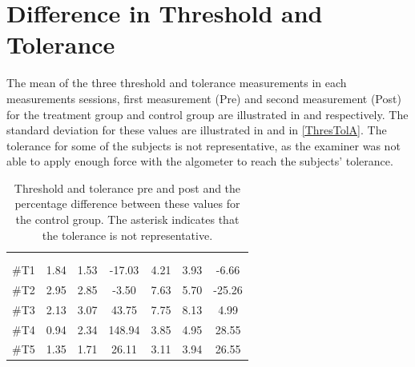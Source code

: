 \section{Difference in Threshold and Tolerance}
The mean of the three threshold and tolerance measurements in each measurements sessions, first measurement (Pre) and second measurement (Post) for the treatment group and control group are illustrated in   and  respectively. The standard deviation for these values are illustrated in  and  in \autoref{ThresTolA}. The tolerance for some of the subjects is not representative, as the examiner was not able to apply enough force with the algometer to reach the subjects' tolerance.

\begin{longtable} {l|c|c|c|c|c|c}
	\caption{Threshold and tolerance pre and post and the percentage difference between these values for the control group. The asterisk indicates that the tolerance is not representative.}
	\label{tab:Treatment} \\
\cellcolor[HTML]{C0C0C0} {} & 
\multicolumn{3}{c|}{ \cellcolor[HTML]{C0C0C0}{\textbf{Threshold}}} & \multicolumn{3}{c}{ \cellcolor[HTML]{C0C0C0}{\textbf{Tolerance}}}  	\\  \rule{0pt}{3ex} 
  \cellcolor[HTML]{C0C0C0}{} &
 \multicolumn{1}{c|}{ \cellcolor[HTML]{C0C0C0}{Pre [KgF]}} & \multicolumn{1}{c|}{ \cellcolor[HTML]{C0C0C0}{Post [KgF]}} 
 & \multicolumn{1}{c}{ \cellcolor[HTML]{C0C0C0}{\textcolor[HTML]{C0C0C0}{0}Diff [\%]\textcolor[HTML]{C0C0C0}{0}}}
 & \multicolumn{1}{|c|}{ \cellcolor[HTML]{C0C0C0}{Pre [KgF]}} 
 & \multicolumn{1}{c|}{ \cellcolor[HTML]{C0C0C0}{Post [KgF]}} 
 & \multicolumn{1}{c}{ \cellcolor[HTML]{C0C0C0}{\textcolor[HTML]{C0C0C0}{0}Diff [\%]\textcolor[HTML]{C0C0C0}{0}}}  	\\ \hline 
\#T1 & 1.84 & 1.53 & -17.03 & 4.21 & 3.93 & -6.66 \\ \hline
\#T2 & 2.95 & 2.85  & -3.50 & 7.63  & 5.70 & -25.26 \\ \hline
\#T3 & 2.13 & 3.07 & 43.75 & 7.75 & 8.13 & 4.99 \\ \hline
\#T4 & 0.94 & 2.34  & 148.94  & 3.85 & 4.95 & 28.55 \\ \hline
\#T5 & 1.35 & 1.71  & 26.11 & 3.11 & 3.94 & 26.55 \\ \hline	

\end{longtable}

